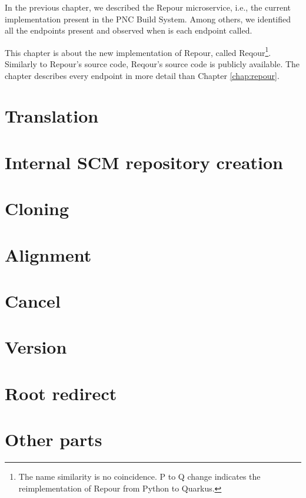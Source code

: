 \documentclass[../../main.tex]{subfiles}
\begin{document}
In the previous chapter, we described the Repour microservice, i.e., the current implementation present in the PNC Build System. Among others, we identified all the endpoints present and observed when is each endpoint called.

This chapter is about the new implementation of Repour, called Reqour\footnote{The name similarity is no coincidence. P to Q change indicates the reimplementation of Repour from Python to Quarkus.}. Similarly to Repour's source code, Reqour's source code is publicly available\cite{reqour}. The chapter describes every endpoint in more detail than Chapter \ref{chap:repour}.

\section{Translation}


\section{Internal SCM repository creation}


\section{Cloning}


\section{Alignment}
\label{section:alignment}


\section{Cancel}


\section{Version}


\section{Root redirect}


\section{Other parts}

\end{document}
